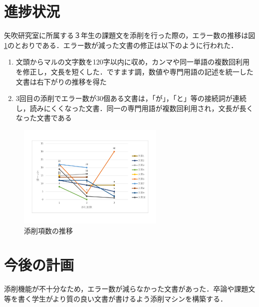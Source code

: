 \documentclass[uplatex,twocolumn,dvipdfmx]{jsarticle}
\begin{document}
\section{進捗状況}
矢吹研究室に所属する３年生の課題文を添削を行った際の，エラー数の推移は図\ref{conf}のとおりである．エラー数が減った文書の修正は以下のように行われた．

\begin{enumerate}
 \item 文頭からマルの文字数を120字以内に収め，カンマや同一単語の複数回利用を修正し，文長を短くした．ですます調，数値や専門用語の記述を統一した文書は右下がりの推移を得た
 \item 3回目の添削でエラー数が30個ある文書は，「が」，「と」等の接続詞が連続し，読みにくくなった文書．同一の専門用語が複数回利用され，文長が長くなった文書である
\end{enumerate}

\begin{figure}[h]
\centering
\includegraphics[width=7cm,clip]{image.pdf}
\caption{添削項数の推移}\label{conf}
\end{figure}

\section{今後の計画}
添削機能が不十分なため，エラー数が減らなかった文書があった．卒論や課題文等を書く学生がより質の良い文書が書けるよう添削マシンを構築する．


\end{document}

